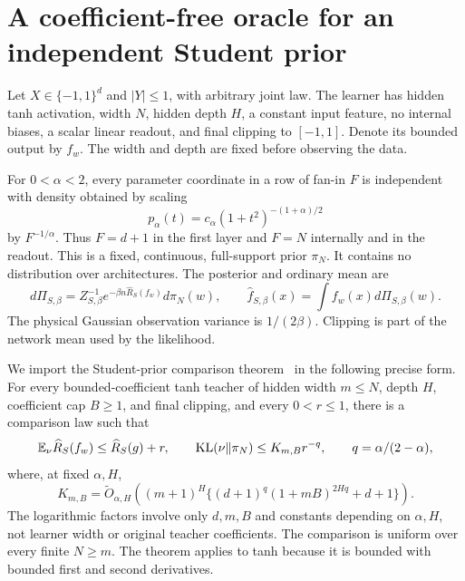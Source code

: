 \section{A coefficient-free oracle for an independent Student prior}
\label{sec:Student-Boolean-oracle}
Let $X\in\{-1,1\}^d$ and $|Y|\le1$, with arbitrary joint law. The learner has hidden tanh activation, width $N$, hidden depth $H$, a constant input feature, no internal biases, a scalar linear readout, and final clipping to $[-1,1]$. Denote its bounded output by $f_w$. The width and depth are fixed before observing the data.

For $0<\alpha<2$, every parameter coordinate in a row of fan-in $F$ is independent with density obtained by scaling
\[
 p_\alpha(t)=c_\alpha(1+t^2)^{-(1+\alpha)/2}
\]
by $F^{-1/\alpha}$. Thus $F=d+1$ in the first layer and $F=N$ internally and in the readout. This is a fixed, continuous, full-support prior $\pi_N$. It contains no distribution over architectures. The posterior and ordinary mean are
\[
 d\Pi_{S,\beta}=Z_{S,\beta}^{-1}
  e^{-\beta n\widehat R_S(f_w)}d\pi_N(w),
 \qquad \widehat f_{S,\beta}(x)=\int f_w(x)d\Pi_{S,\beta}(w).
\]
The physical Gaussian observation variance is $1/(2\beta)$. Clipping is part of the network mean used by the likelihood.

We import the Student-prior comparison theorem~\cite{student} in the following precise form. For every bounded-coefficient tanh teacher of hidden width $m\le N$, depth $H$, coefficient cap $B\ge1$, and final clipping, and every $0<r\le1$, there is a comparison law such that
\begin{equation}
 \mathbb E_\nu\widehat R_S(f_w)\le\widehat R_S(g)+r,
 \qquad \operatorname{KL}(\nu\Vert\pi_N)\le K_{m,B}r^{-q},
 \qquad q=\alpha/(2-\alpha),
 \label{eq:Student-comparison}
\end{equation}
where, at fixed $\alpha,H$,
\begin{equation}
 K_{m,B}=\widetilde O_{\alpha,H}\left(
 (m+1)^H\{(d+1)^q(1+mB)^{2Hq}+d+1\}\right).
 \label{eq:Student-resource}
\end{equation}
The logarithmic factors involve only $d,m,B$ and constants depending on $\alpha,H$, not learner width or original teacher coefficients. The comparison is uniform over every finite $N\ge m$. The theorem applies to tanh because it is bounded with bounded first and second derivatives.

